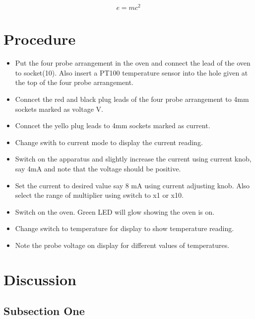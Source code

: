 \documentclass[twoside,twocolumn]{article}
\begin{document}
\blindtext %

\begin{equation}
\label{eq:emc}
e = mc^2
\end{equation}

\blindtext %

\section{Procedure}


\begin{itemize}
\item Put the four probe arrangement in the oven and connect the lead of the oven to socket(10). Also insert a PT100 temperature sensor into the hole given at the top of the four probe arrangement. 
\item Conncet the red and black plug leads of the four probe arrangement to 4mm sockets marked as voltage V. 
\item Conncet the yello plug leads to 4mm sockets marked as current. 
\item Change swith to current mode to display the current reading. 
\item Switch on the apparatus and slightly increase the current using current knob, say 4mA and note that the voltage should be positive.
\item Set the current to desired value say 8 mA using current adjusting knob. Also select the range of multiplier using switch to x1 or x10.
\item Switch on the oven. Green LED will glow showing the oven is on. 
\item Change switch to temperature for display to show temperature reading. 
\item Note the probe voltage on display for different values of temperatures.
\end{itemize}


\section{Discussion}

\subsection{Subsection One}
\end{document}
